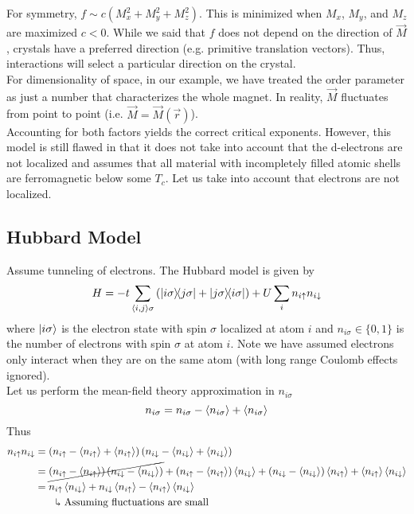 \documentclass[12pt,a4paper,titlepage]{article}
\newcommand{\trm}[1]{\textrm{#1}} %
\newcommand{\up}{\uparrow} %
\newcommand{\dn}{\downarrow} %
\newcommand{\explain}{\quad\rotatebox[origin=c]{180}{$\Lsh$}} %
\begin{document}
For symmetry, $f\sim c(M_{x}^{2}+M_{y}^{2}+M_{z}^{2})$. This is minimized when $M_{x}$, $M_{y}$, and $M_{z}$ are maximized $c<0$. While we said that $f$ does not depend on the direction of $\vec{M}$, crystals have a preferred direction (e.g. primitive translation vectors). Thus, interactions will select a particular direction on the crystal.\\

For dimensionality of space, in our example, we have treated the order parameter as just a number that characterizes the whole magnet. In reality, $\vec{M}$ fluctuates from point to point (i.e. $\vec{M}=\vec{M}(\vec{r})$).\\

Accounting for both factors yields the correct critical exponents. However, this model is still flawed in that it does not take into account that the d-electrons are not localized and assumes that all material with incompletely filled atomic shells are ferromagnetic below some $T_{c}$. Let us take into account that electrons are not localized.

\subsection{Hubbard Model}
Assume tunneling of electrons. The Hubbard model is given by
\begin{equation}
H=-t\sum_{\langle i,j\rangle\sigma}\left(\ketbra{i\sigma}{j\sigma}+\ketbra{j\sigma}{i\sigma}\right)+U\sum_{i}n_{i\up}n_{i\dn}
\end{equation}
where $\ket{i\sigma}$ is the electron state with spin $\sigma$ localized at atom $i$ and $n_{i\sigma}\in\{0,1\}$ is the number of electrons with spin $\sigma$ at atom $i$. Note we have assumed electrons only interact when they are on the same atom (with long range Coulomb effects ignored).\\

Let us perform the mean-field theory approximation in $n_{i\sigma}$
\begin{equation}
n_{i\sigma}=n_{i\sigma}-\expval{n_{i\sigma}}+\expval{n_{i\sigma}}
\end{equation}
Thus
\begin{equation}
\begin{aligned}
n_{i\up}n_{i\dn}&=\left(n_{i\up}-\expval{n_{i\up}}+\expval{n_{i\up}}\right)\left(n_{i\dn}-\expval{n_{i\dn}}+\expval{n_{i\dn}}\right)\\
&=\cancel{\left(n_{i\up}-\expval{n_{i\up}}\right)\left(n_{i\dn}-\expval{n_{i\dn}}\right)}+\left(n_{i\up}-\expval{n_{i\up}}\right)\expval{n_{i\dn}}+\left(n_{i\dn}-\expval{n_{i\dn}}\right)\expval{n_{i\up}}+\expval{n_{i\up}}\expval{n_{i\dn}}\\
&=n_{i\up}\expval{n_{i\dn}}+n_{i\dn}\expval{n_{i\up}}-\expval{n_{i\up}}\expval{n_{i\dn}}\\
&\quad\explain\trm{ Assuming fluctuations are small}
\end{aligned}
\end{equation}
\end{document}
